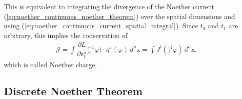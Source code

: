 \documentclass[12pt,a4paper,reqno]{article}
\begin{document}
This is equivalent to integrating the divergence of the Noether current (\ref{eq:noether_continuous_noether_theorem}) over the spatial dimensions and using (\ref{eq:noether_continuous_current_spatial_integral}).
Since $t_{0}$ and $t_{1}$ are arbitrary, this implies the conservation of
\begin{align}\label{eq:noether_continuous_charge}
\mathcal{J}
= \int \dfrac{\partial L}{\partial {\ensuremath{{\ensuremath{\mathrm{{z}}}}}}^{a}_{t}} \big( {\ensuremath{\mathrm{j}}}^{1} {\ensuremath{\varphi}} \big) \cdot \eta^{a} ({\ensuremath{\varphi}}) \, d^{n} {\ensuremath{{\ensuremath{\mathrm{{x}}}}}}
= \int J^{t} ({\ensuremath{\mathrm{j}}}^{1} {\ensuremath{\varphi}}) \, d^{n} {\ensuremath{{\ensuremath{\mathrm{{x}}}}}} ,
\end{align}
which is called Noether charge.

\subsection{Discrete Noether Theorem}
\label{sec:vi_discrete_noether_theorem}
\end{document}
